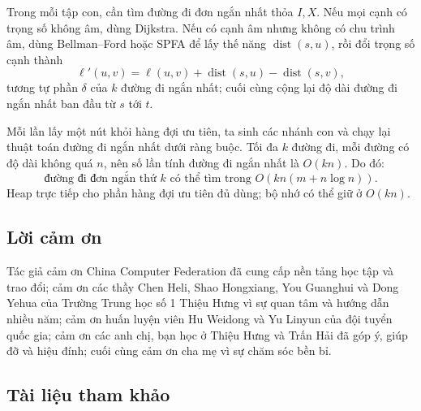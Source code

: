 \documentclass[11pt]{article}
\begin{document}
Trong mỗi tập con, cần tìm đường đi đơn ngắn nhất thỏa \(I,X\). Nếu mọi cạnh có
trọng số không âm, dùng Dijkstra. Nếu có cạnh âm nhưng không có chu trình âm,
dùng Bellman--Ford hoặc SPFA để lấy thế năng \(\operatorname{dist}(s,u)\), rồi
đổi trọng số cạnh thành
\[
  \ell'(u,v)=\ell(u,v)+\operatorname{dist}(s,u)-\operatorname{dist}(s,v),
\]
tương tự phần \(\delta\) của \(k\) đường đi ngắn nhất; cuối cùng cộng lại độ
dài đường đi ngắn nhất ban đầu từ \(s\) tới \(t\).

Mỗi lần lấy một nút khỏi hàng đợi ưu tiên, ta sinh các nhánh con và chạy lại
thuật toán đường đi ngắn nhất dưới ràng buộc. Tối đa \(k\) đường đi, mỗi đường
có độ dài không quá \(n\), nên số lần tính đường đi ngắn nhất là \(O(kn)\). Do
đó:
\[
  \text{đường đi đơn ngắn thứ \(k\) có thể tìm trong }
  O(kn(m+n\log n)).
\]
Heap trực tiếp cho phần hàng đợi ưu tiên đủ dùng; bộ nhớ có thể giữ ở
\(O(kn)\).

\subsection*{Lời cảm ơn}

Tác giả cảm ơn China Computer Federation đã cung cấp nền tảng học tập và trao
đổi; cảm ơn các thầy Chen Heli, Shao Hongxiang, You Guanghui và Dong Yehua của
Trường Trung học số 1 Thiệu Hưng vì sự quan tâm và hướng dẫn nhiều năm; cảm ơn
huấn luyện viên Hu Weidong và Yu Linyun của đội tuyển quốc gia; cảm ơn các anh
chị, bạn học ở Thiệu Hưng và Trấn Hải đã góp ý, giúp đỡ và hiệu đính; cuối cùng
cảm ơn cha mẹ vì sự chăm sóc bền bỉ.

\subsection*{Tài liệu tham khảo}
\end{document}
